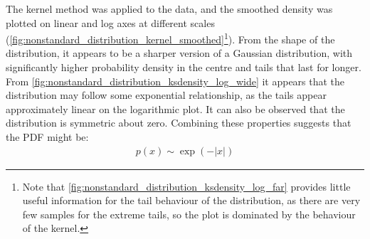 \documentclass[a4paper]{article}
\begin{document}
The kernel method was applied to the data, and the smoothed density was plotted on linear and log axes at different
scales (\autoref{fig:nonstandard_distribution_kernel_smoothed}\footnote{Note that
\autoref{fig:nonstandard_distribution_ksdensity_log_far} provides little useful information for the tail behaviour of
the distribution, as there are very few samples for the extreme tails, so the plot is dominated by the
behaviour of the kernel.}).
From the shape of the distribution, it appears to be a sharper version of a Gaussian distribution, with significantly
higher probability density in the centre and tails that last for longer.
From \autoref{fig:nonstandard_distribution_ksdensity_log_wide} it appears that the distribution may follow some
exponential relationship, as the tails appear approximately linear on the logarithmic plot.
It can also be observed that the distribution is symmetric about zero.
Combining these properties suggests that the PDF might be:
\begin{align*}
    p(x) \sim \exp(-|x|)
\end{align*}
\end{document}
